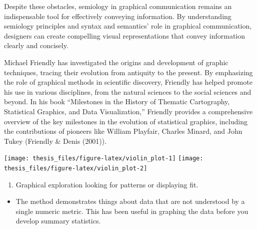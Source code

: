 \documentclass[print]{nuthesis}
\providecommand{\tightlist}{%
  \setlength{\itemsep}{0pt}\setlength{\parskip}{0pt}}
\begin{document}
Despite these obstacles, semiology in graphical communication remains an indispensable tool for effectively conveying information.
By understanding semiology principles and syntax and semantics' role in graphical communication, designers can create compelling visual representations that convey information clearly and concisely.

Michael Friendly has investigated the origins and development of graphic techniques, tracing their evolution from antiquity to the present.
By emphasizing the role of graphical methods in scientific discovery, Friendly has helped promote his use in various disciplines, from the natural sciences to the social sciences and beyond.
In his book ``Milestones in the History of Thematic Cartography, Statistical Graphics, and Data Visualization,'' Friendly provides a comprehensive overview of the key milestones in the evolution of statistical graphics, including the contributions of pioneers like William Playfair, Charles Minard, and John Tukey (Friendly \& Denis (2001)).


\begin{center}\texttt{[image: thesis\_files/figure-latex/violin\_plot-1]} \texttt{[image: thesis\_files/figure-latex/violin\_plot-2]} \end{center}


\begin{enumerate}
\def\labelenumi{\arabic{enumi}.}
\tightlist
\item
  Graphical exploration looking for patterns or displaying fit.
\end{enumerate}

\begin{itemize}
\tightlist
\item
  The method demonstrates things about data that are not understood by a single numeric metric.
  This has been useful in graphing the data before you develop summary statistics.
\end{itemize}
\end{document}
